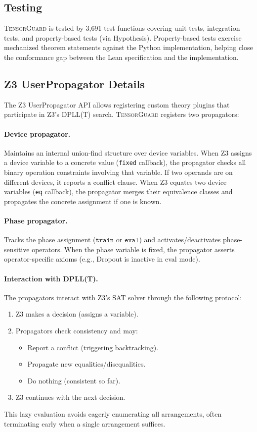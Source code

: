 \documentclass[10pt]{article}
\newcommand{\tguard}{\textsc{TensorGuard}}
\theoremstyle{plain}
\theoremstyle{definition}
\theoremstyle{remark}
\begin{document}
\subsection{Testing}

\tguard{} is tested by 3{,}691 test functions covering unit tests,
integration tests, and property-based tests (via Hypothesis).
Property-based tests exercise mechanized theorem statements against
the Python implementation, helping close the conformance gap between
the Lean specification and the implementation.

\subsection{Z3 UserPropagator Details}

The Z3 UserPropagator API allows registering custom theory plugins
that participate in Z3's DPLL(T) search.  \tguard{} registers two
propagators:

\paragraph{Device propagator.}
Maintains an internal union-find structure over device variables.
When Z3 assigns a device variable to a concrete value (\texttt{fixed}
callback), the propagator checks all binary operation constraints
involving that variable.  If two operands are on different devices,
it reports a conflict clause.  When Z3 equates two device variables
(\texttt{eq} callback), the propagator merges their equivalence
classes and propagates the concrete assignment if one is known.

\paragraph{Phase propagator.}
Tracks the phase assignment ($\texttt{train}$ or $\texttt{eval}$) and
activates/deactivates phase-sensitive operators.  When the phase
variable is fixed, the propagator asserts operator-specific axioms
(e.g., Dropout is inactive in eval mode).

\paragraph{Interaction with DPLL(T).}
The propagators interact with Z3's SAT solver through the following
protocol:
\begin{enumerate}[nosep]
  \item Z3 makes a decision (assigns a variable).
  \item Propagators check consistency and may:
    \begin{itemize}[nosep]
      \item Report a conflict (triggering backtracking).
      \item Propagate new equalities/disequalities.
      \item Do nothing (consistent so far).
    \end{itemize}
  \item Z3 continues with the next decision.
\end{enumerate}
This lazy evaluation avoids eagerly enumerating all arrangements,
often terminating early when a single arrangement suffices.
\end{document}

